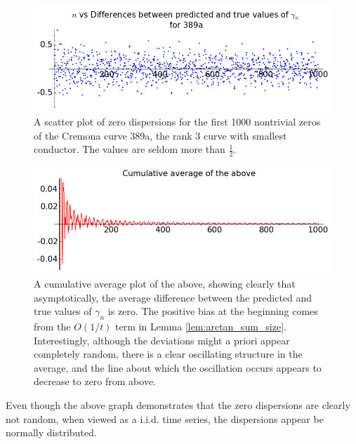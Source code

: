 \begin{figure}[!h]
    \centering
    \includegraphics[width=1.0\textwidth]{graphics/389a_zero_dispersions_scatterplot.png}
    \caption{A scatter plot of zero dispersions for the first 1000 nontrivial zeros of the Cremona curve 389a, the rank 3 curve with smallest conductor. The values are seldom more than $\frac{1}{2}$.}
    \label{fig:389a_zero_dispersions_scatterplot}
\end{figure}

\begin{figure}[!h]
    \centering
    \includegraphics[width=1.0\textwidth]{graphics/389a_zero_dispersions_cumulative_average.png}
    \caption{A cumulative average plot of the above, showing clearly that asymptotically, the average difference between the predicted and true values of $\gamma_n$ is zero. The positive bias at the beginning comes from the $O(1/t)$ term in Lemma \ref{lem:arctan_sum_size}. Interestingly, although the deviations might a priori appear completely random, there is a clear oscillating structure in the average, and the line about which the oscillation occurs appears to decrease to zero from above.}
    \label{fig:zero_dispersions_cumulative_average}
\end{figure}

Even though the above graph demonstrates that the zero dispersions are clearly not random, when viewed as a i.i.d. time series, the dispersions appear be normally distributed. \\

